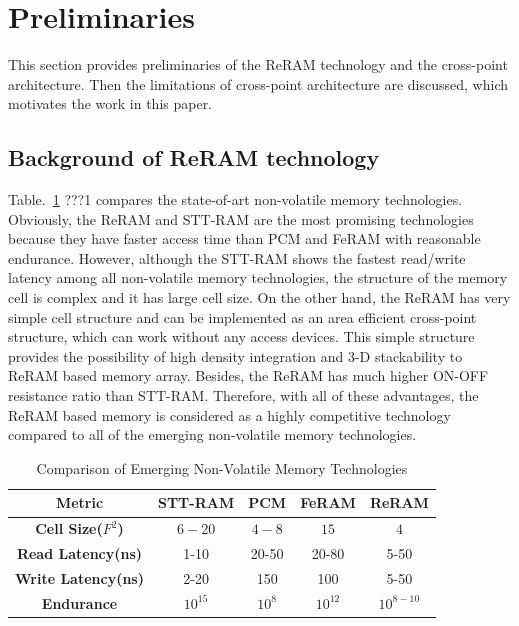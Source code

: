 \vspace{10pt}
\section{Preliminaries}\label{sec:preliminary}

This section provides preliminaries of the ReRAM technology and the cross-point architecture. Then the limitations of cross-point architecture are discussed, which motivates the work in this paper.


\subsection{Background of ReRAM technology}
Table.~\ref{table:compare} ???1 compares the state-of-art non-volatile memory technologies. Obviously, the ReRAM and STT-RAM are the most promising technologies because they have faster access time than PCM and FeRAM with reasonable endurance. However, although the STT-RAM shows the fastest read/write latency among all non-volatile memory technologies, the structure of the memory cell is complex and it has large cell size. On the other hand, the ReRAM has very simple cell structure and can be implemented as an area efficient cross-point structure, which can work without any access devices. This simple structure provides the possibility of high density integration and 3-D stackability to ReRAM based memory array. Besides, the ReRAM has much higher ON-OFF resistance ratio than STT-RAM. Therefore, with all of these advantages, the ReRAM based memory is considered as a highly competitive technology compared to all of the emerging non-volatile memory technologies.

\begin{table}[!tb]
  \centering
  \scriptsize
    \scriptsize
  \caption{Comparison of Emerging Non-Volatile Memory Technologies}\label{table:compare}
  \vspace{-5pt}
  \begin{tabular}{|c|cccc|}
    \hline
    \textbf{Metric} & \textbf{STT-RAM} & \textbf{PCM}    & \textbf{FeRAM} & \textbf{ReRAM}
    \\\hline
    \textbf{Cell Size($F^2$)} & $6-20$ & $4-8$ & $15$ & $4$\\\hline
    \textbf{Read Latency(ns)} &  1-10 & 20-50 & 20-80 & 5-50\\\hline
    \textbf{Write Latency(ns)} & 2-20& 150& 100& 5-50\\\hline
    \textbf{Endurance} &  $10^{15}$ & $10^8$ & $10^{12}$ & $10^{8-10}$\\\hline
  \end{tabular}
  \vspace{-10pt}
\end{table}


